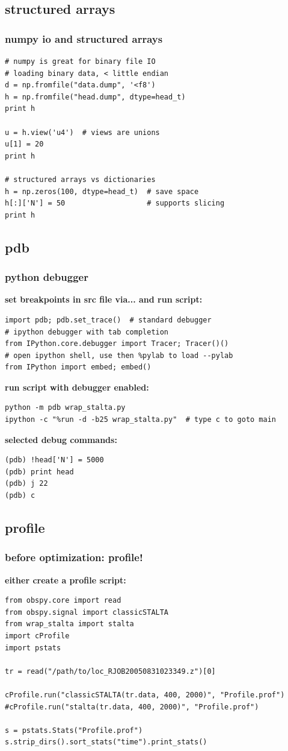 \documentclass[utf8, compress, hyperref={pdftex=true,pdfpagemode=FullScreen}, graphicx={pdftex}]{beamer}
\begin{document}
\subsection{structured arrays}
\begin{frame}[fragile]
    \frametitle{numpy io and structured arrays}
    \begin{lstlisting}
# numpy is great for binary file IO
# loading binary data, < little endian
d = np.fromfile("data.dump", '<f8')
h = np.fromfile("head.dump", dtype=head_t)
print h

u = h.view('u4')  # views are unions
u[1] = 20
print h

# structured arrays vs dictionaries
h = np.zeros(100, dtype=head_t)  # save space
h[:]['N'] = 50                   # supports slicing
print h
    \end{lstlisting}
\end{frame}

\subsection{pdb}
\begin{frame}[fragile]
    \frametitle{python debugger}
    \textbf{set breakpoints in src file via... and run script:}
    \begin{lstlisting}
import pdb; pdb.set_trace()  # standard debugger
# ipython debugger with tab completion
from IPython.core.debugger import Tracer; Tracer()()
# open ipython shell, use then %pylab to load --pylab
from IPython import embed; embed()
    \end{lstlisting}
    \textbf{run script with debugger enabled:}
    \begin{lstlisting}
python -m pdb wrap_stalta.py
ipython -c "%run -d -b25 wrap_stalta.py"  # type c to goto main
    \end{lstlisting}

    \textbf{selected debug commands:}
    \begin{lstlisting}
(pdb) !head['N'] = 5000
(pdb) print head
(pdb) j 22
(pdb) c
    \end{lstlisting}
\end{frame}

\subsection{profile}
\begin{frame}[fragile]
    \frametitle{before optimization: profile!}
    \textbf{either create a profile script:}
    \begin{lstlisting}
from obspy.core import read
from obspy.signal import classicSTALTA
from wrap_stalta import stalta
import cProfile
import pstats

tr = read("/path/to/loc_RJOB20050831023349.z")[0]

cProfile.run("classicSTALTA(tr.data, 400, 2000)", "Profile.prof")
#cProfile.run("stalta(tr.data, 400, 2000)", "Profile.prof")

s = pstats.Stats("Profile.prof")
s.strip_dirs().sort_stats("time").print_stats()
    \end{lstlisting}
\end{frame}
\end{document}
